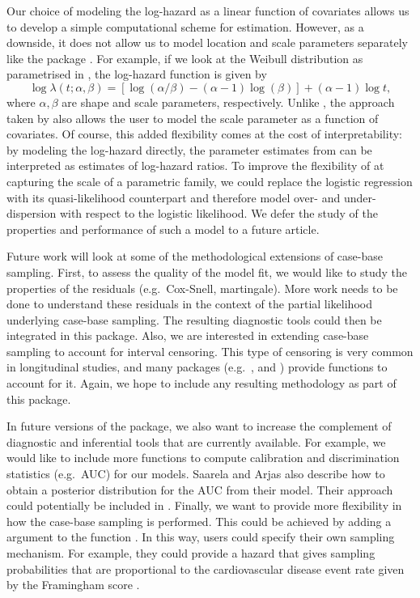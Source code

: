 Our choice of modeling the log-hazard as a linear function of covariates
allows us to develop a simple computational scheme for estimation.
However, as a downside, it does not allow us to model location and scale
parameters separately like the package . For example, if
we look at the Weibull distribution as parametrised in
, the log-hazard function is given by
\[ \log \lambda(t; \alpha, \beta) = \left[\log(\alpha/\beta) - (\alpha - 1)\log(\beta)\right] + (\alpha - 1)\log t,\]
where \(\alpha,\beta\) are shape and scale parameters, respectively.
Unlike , the approach taken by  also allows
the user to model the scale parameter as a function of covariates. Of
course, this added flexibility comes at the cost of interpretability: by
modeling the log-hazard directly, the parameter estimates from
 can be interpreted as estimates of log-hazard ratios. To
improve the flexibility of  at capturing the scale of a
parametric family, we could replace the logistic regression with its
quasi-likelihood counterpart and therefore model over- and
under-dispersion with respect to the logistic likelihood. We defer the
study of the properties and performance of such a model to a future
article.

Future work will look at some of the methodological extensions of
case-base sampling. First, to assess the quality of the model fit, we
would like to study the properties of the residuals (e.g.~Cox-Snell,
martingale). More work needs to be done to understand these residuals in
the context of the partial likelihood underlying case-base sampling. The
resulting diagnostic tools could then be integrated in this package.
Also, we are interested in extending case-base sampling to account for
interval censoring. This type of censoring is very common in
longitudinal studies, and many packages (e.g.~,
 and ) provide functions to account for it.
Again, we hope to include any resulting methodology as part of this
package.

In future versions of the package, we also want to increase the
complement of diagnostic and inferential tools that are currently
available. For example, we would like to include more functions to
compute calibration and discrimination statistics (e.g.~AUC) for our
models. Saarela and Arjas \citeyearpar{saarela2015non} also describe how
to obtain a posterior distribution for the AUC from their model. Their
approach could potentially be included in . Finally, we
want to provide more flexibility in how the case-base sampling is
performed. This could be achieved by adding a  argument to
the function . In this way, users could specify
their own sampling mechanism. For example, they could provide a hazard
that gives sampling probabilities that are proportional to the
cardiovascular disease event rate given by the Framingham score
\citep{saarela2015non}.

